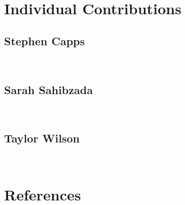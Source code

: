 \documentclass[11pt]{article}
\begin{document}
\indent
\section{Individual Contributions}
\subsection{Stephen Capps}$ $
\indent 
\subsection{Sarah Sahibzada}$ $
\indent 
\subsection{Taylor Wilson}$ $
\indent 


\newpage
\section{References}
\end{document}
